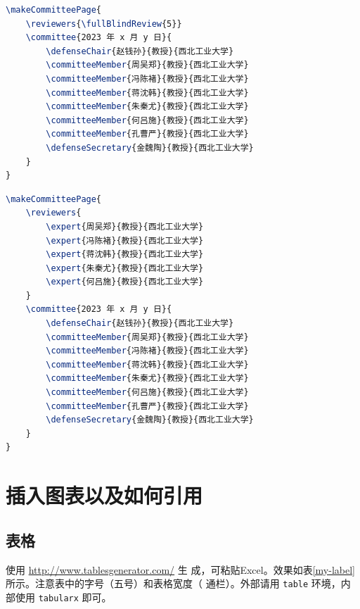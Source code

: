 \documentclass[lang=chs, degree=phd, blindreview=false, winfonts=true, academic=true]{yanputhesis}
\begin{document}
\begin{lstlisting}[language={TeX}, label={code:makeBlindReviewerCommitteePage},
    caption={盲评样例 makeBlindReviewerCommitteePage.tex}]
\makeCommitteePage{
    \reviewers{\fullBlindReview{5}}
    \committee{2023 年 x 月 y 日}{
        \defenseChair{赵钱孙}{教授}{西北工业大学}
        \committeeMember{周吴郑}{教授}{西北工业大学}
        \committeeMember{冯陈褚}{教授}{西北工业大学}
        \committeeMember{蒋沈韩}{教授}{西北工业大学}
        \committeeMember{朱秦尤}{教授}{西北工业大学}
        \committeeMember{何吕施}{教授}{西北工业大学}
        \committeeMember{孔曹严}{教授}{西北工业大学}
        \defenseSecretary{金魏陶}{教授}{西北工业大学}
    }
}
\end{lstlisting}

\begin{lstlisting}[language={TeX}, label={code:makeOpenReviewerCommitteePage},
    caption={明审样例 makeOpenReviewerCommitteePage.tex}]
\makeCommitteePage{
    \reviewers{
        \expert{周吴郑}{教授}{西北工业大学}
        \expert{冯陈褚}{教授}{西北工业大学}
        \expert{蒋沈韩}{教授}{西北工业大学}
        \expert{朱秦尤}{教授}{西北工业大学}
        \expert{何吕施}{教授}{西北工业大学}
    }
    \committee{2023 年 x 月 y 日}{
        \defenseChair{赵钱孙}{教授}{西北工业大学}
        \committeeMember{周吴郑}{教授}{西北工业大学}
        \committeeMember{冯陈褚}{教授}{西北工业大学}
        \committeeMember{蒋沈韩}{教授}{西北工业大学}
        \committeeMember{朱秦尤}{教授}{西北工业大学}
        \committeeMember{何吕施}{教授}{西北工业大学}
        \committeeMember{孔曹严}{教授}{西北工业大学}
        \defenseSecretary{金魏陶}{教授}{西北工业大学}
    }
}
\end{lstlisting}

\cleardoublepage

\chapter{插入图表以及如何引用}

\section{表格}

使用 \href{http://www.tablesgenerator.com/}{http://www.tablesgenerator.com/} 生
成，可粘贴Excel。效果如表\ref{my-label}所示。注意表中的字号（五号）和表格宽度（
通栏）。外部请用 \lstinline`table` 环境，内部使用 \lstinline`tabularx` 即可。
\end{document}
